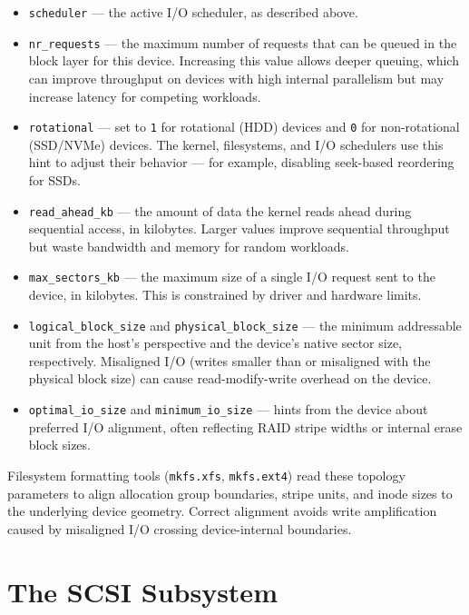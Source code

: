 \begin{itemize}
  \item \texttt{scheduler} --- the active I/O scheduler, as described above.
  \item \texttt{nr\_requests} --- the maximum number of requests that can be queued in the block layer for this device. Increasing this value allows deeper queuing, which can improve throughput on devices with high internal parallelism but may increase latency for competing workloads.
  \item \texttt{rotational} --- set to \texttt{1} for rotational (HDD) devices and \texttt{0} for non-rotational (SSD/NVMe) devices. The kernel, filesystems, and I/O schedulers use this hint to adjust their behavior --- for example, disabling seek-based reordering for SSDs.
  \item \texttt{read\_ahead\_kb} --- the amount of data the kernel reads ahead during sequential access, in kilobytes. Larger values improve sequential throughput but waste bandwidth and memory for random workloads.
  \item \texttt{max\_sectors\_kb} --- the maximum size of a single I/O request sent to the device, in kilobytes. This is constrained by driver and hardware limits.
  \item \texttt{logical\_block\_size} and \texttt{physical\_block\_size} --- the minimum addressable unit from the host's perspective and the device's native sector size, respectively. Misaligned I/O (writes smaller than or misaligned with the physical block size) can cause read-modify-write overhead on the device.
  \item \texttt{optimal\_io\_size} and \texttt{minimum\_io\_size} --- hints from the device about preferred I/O alignment, often reflecting RAID stripe widths or internal erase block sizes.
\end{itemize}

Filesystem formatting tools (\texttt{mkfs.xfs}, \texttt{mkfs.ext4}) read these topology parameters to align allocation group boundaries, stripe units, and inode sizes to the underlying device geometry. Correct alignment avoids write amplification caused by misaligned I/O crossing device-internal boundaries.

\section{The SCSI Subsystem}
\label{sec:scsi}

